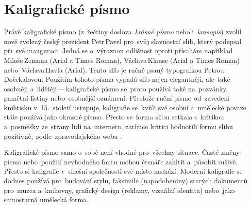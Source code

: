\documentclass[a4paper, 11pt]{article}
\begin{document}
\section*{Kaligrafické písmo}

Právě kaligrafické písmo (z~řečtiny doslova~\emph{krásné písmo}
neboli~\emph{krasopis}) zvolil nově zvolený český prezident Petr\,Pavel
pro~svůj slavnostní slib, který podepsal 
při~své inauguraci. Jedná se o~výraznou odlišnost oproti přísahám
například Miloše\,Zemana (Arial a Times Roman),
Václava\,Klause (Arial a Times Roman) nebo~Václava\,Havla (Arial).
Tento slib je ručně psaný typografkou Petrou\,Dočekalovou.
\parencite{Font:2023:SlibPrezidenta}
Použitím tohoto písma vypadá slib nejen elegantněji, ale~také osobněji
a~lidštěji\,---\,kaligrafické písmo se~proto používá také
na~pozvánky, pamětní listiny nebo~osobnější oznámení.
\parencite{Kaucky:2018:Kaligrafie}
Přestože ruční písmo od~zavedení knihtisku v~15.\ století ustupuje,
kaligrafie se~kvůli své osobní a~umělecké povaze stále používá jako
okrasné písmo. \parencite{Zapf:2007:Alphabet}
Přesto se~forma slibu setkala s~kritikou a~posměšky ze~strany lidí
na~internetu, zatímco kritici hodnotili formu slibu pozitivně,
podle~zpravodajského webu \textcite{Seznam:2023:KritikaSlibu}.

Kaligrafické písmo samo o~sobě není vhodné pro~všechny situace.
Časté změny písma nebo~použití nevhodného fontu mohou čtenáře zahltit
a~působit rušivě. \parencite{Rajlich:1998:TypografiePrelomu}
Přesto si kaligrafie v~dnešní společnosti své místo nachází.
Moderní kaligrafie se dodnes používá pro~budování stylu,
faksimile (napodobeniny) starých dokumentů pro~muzea a~knihovny,
grafický design (reklamy, vizuální identita) nebo~jako samostatná umělecká
forma. \parencite{Kafka:2018:Kaligrafie}

\newpage
\renewcommand{\refname}{Literatura}
\printbibliography{}
\end{document}
